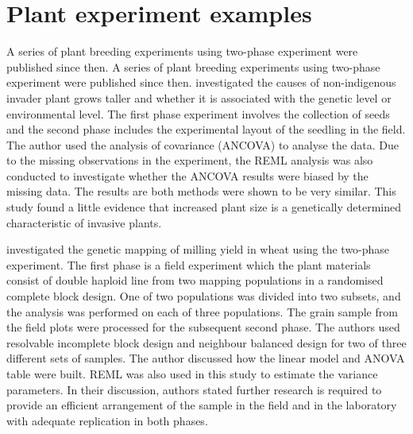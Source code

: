 \documentclass[11pt,a4paper]{article}
\begin{document}
\section{Plant experiment examples}
A series of plant breeding experiments using two-phase experiment were published since then. A series of plant breeding experiments using two-phase experiment were published since then. \cite{Willis2000} investigated the causes of non-indigenous invader plant grows taller and whether it is associated with the genetic level or environmental level. The first phase experiment involves the collection of seeds and the second phase includes the experimental layout of the seedling in the field. The author used the analysis of covariance (ANCOVA) to analyse the data. Due to the missing observations in the experiment, the REML analysis was also conducted to investigate whether the ANCOVA results were biased by the missing data. The results are both methods were shown to be very similar. This study found a little evidence that increased plant size is a genetically determined characteristic of invasive plants.
  
\cite{Smith2001} investigated the genetic mapping of milling yield in wheat using the two-phase experiment. The first phase is a field experiment which the plant materials consist of double haploid line from two mapping populations in a randomised complete block design. One of two populations was divided into two subsets, and the analysis was performed on each of three populations. The grain sample from the field plots were processed for the subsequent second phase. The authors used resolvable incomplete block design and neighbour balanced design for two of three different sets of samples. The author discussed how the linear model and ANOVA table were built. REML was also used in this study to estimate the variance parameters. In their discussion, authors stated further research is required to provide an efficient arrangement of the sample in the field and in the laboratory with adequate replication in both phases.
\end{document}
